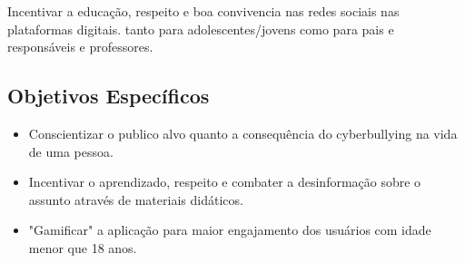 Incentivar a educação, respeito e boa convivencia nas redes sociais nas plataformas digitais. tanto para adolescentes/jovens como para pais e responsáveis e professores.


\subsection{Objetivos Específicos}

\begin{itemize}
  \item Conscientizar o publico alvo quanto a consequência do cyberbullying na vida de uma pessoa.
  \item Incentivar o aprendizado, respeito e combater a desinformação sobre o assunto através de materiais didáticos.
  \item "Gamificar" a aplicação para maior engajamento dos usuários com idade menor que 18 anos.
\end{itemize}


 